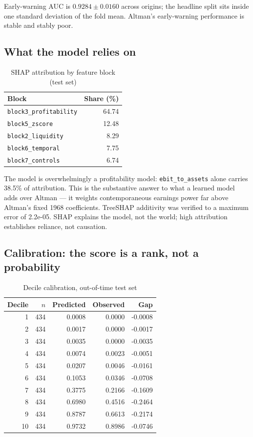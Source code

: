 \documentclass[conference]{IEEEtran}
\begin{document}
Early-warning AUC is $0.9284 \pm 0.0160$ across origins; the headline
split sits inside one standard deviation of the fold mean. Altman's
early-warning performance is stable and stably poor.

\subsection{What the model relies on}

\begin{table}[htbp]
\caption{SHAP attribution by feature block (test set)}
\label{tab:shap}
\centering
\begin{tabular}{lr}
\toprule
Block & Share (\%) \\
\midrule
\texttt{block3\_profitability} & 64.74 \\
\texttt{block5\_zscore} & 12.48 \\
\texttt{block2\_liquidity} & 8.29 \\
\texttt{block6\_temporal} & 7.75 \\
\texttt{block7\_controls} & 6.74 \\
\bottomrule
\end{tabular}
\end{table}

The model is overwhelmingly a profitability model: \texttt{ebit\_to\_assets}
alone carries 38.5\% of attribution. This is the substantive answer to
what a learned model adds over Altman --- it weights contemporaneous earnings
power far above Altman's fixed 1968 coefficients. TreeSHAP additivity was
verified to a maximum error of 2.2e-05. SHAP explains the model, not
the world; high attribution establishes reliance, not causation.

\subsection{Calibration: the score is a rank, not a probability}

\begin{table}[htbp]
\caption{Decile calibration, out-of-time test set}
\label{tab:cal}
\centering
\begin{tabular}{rrrrr}
\toprule
Decile & $n$ & Predicted & Observed & Gap \\
\midrule
1 & 434 & 0.0008 & 0.0000 & -0.0008 \\
2 & 434 & 0.0017 & 0.0000 & -0.0017 \\
3 & 434 & 0.0035 & 0.0000 & -0.0035 \\
4 & 434 & 0.0074 & 0.0023 & -0.0051 \\
5 & 434 & 0.0207 & 0.0046 & -0.0161 \\
6 & 434 & 0.1053 & 0.0346 & -0.0708 \\
7 & 434 & 0.3775 & 0.2166 & -0.1609 \\
8 & 434 & 0.6980 & 0.4516 & -0.2464 \\
9 & 434 & 0.8787 & 0.6613 & -0.2174 \\
10 & 434 & 0.9732 & 0.8986 & -0.0746 \\
\bottomrule
\end{tabular}
\end{table}
\end{document}
